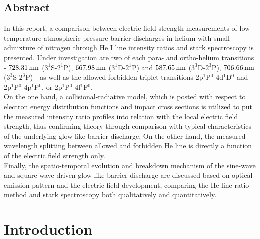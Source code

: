 \documentclass[a4paper,10pt,twoside]{article}
\begin{document}
	\begin{multicols}{2}
		\tableofcontents
	\end{multicols}
	
		\vspace{0.75cm}
	
		\subsection*{Abstract}
		
			In this report, a comparison between electric field strength measurements of low-temperature atmospheric pressure barrier discharges in helium with small admixture of nitrogen through He I line intensity ratios and stark spectroscopy is presented. Under investigation are two of each para- and ortho-helium transitions - $\unit[728.31]{nm}$ ($3^1$S-$2^1$P), $\unit[667.98]{nm}$ ($3^1$D-$2^1$P) and $\unit[587.65]{nm}$ ($3^3$D-$2^3$P), $\unit[706.66]{nm}$ ($3^3$S-$2^3$P) - as well as the allowed-forbidden triplet transitions 2p$^1$P$^0$-4d$^1$D$^0$ and 2p$^1$P$^0$-4p$^1$P$^0$, or 2p$^1$P$^0$-4f$^1$F$^0$.\\
			On the one hand, a collisional-radiative model, which is posted with respect to electron energy distribution
			functions and impact cross sections is utilized to put the measured intensity ratio profiles into relation with the local electric field strength, thus confirming theory through comparison with typical characteristics of the underlying glow-like barrier discharge. On the other hand, the measured wavelength splitting between allowed and forbidden He line is directly a function of the electric field strength only.\\
			Finally, the spatio-temporal evolution and breakdown mechanism of the sine-wave and square-wave driven glow-like barrier discharge are discussed based on optical emission pattern and the electric field development, comparing the He-line ratio method and stark spectroscopy both qualitatively and quantitatively. 
			
					 
	\twocolumn

	\section{Introduction}\label{sec:intro}
\end{document}
